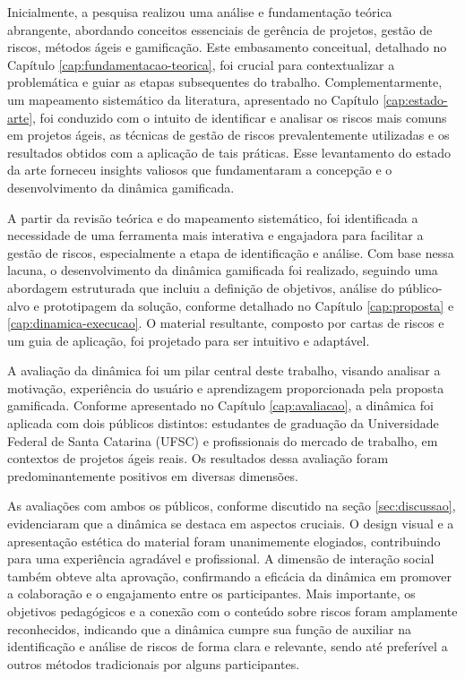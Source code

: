 \documentclass[
	12pt,
	openright,
	twoside,
	a4paper,
	english,
	brazil
	]{abntex2}
\begin{document}
Inicialmente, a pesquisa realizou uma análise e fundamentação teórica abrangente, abordando conceitos essenciais de gerência de projetos, gestão de riscos, métodos ágeis e gamificação. Este embasamento conceitual, detalhado no Capítulo \ref{cap:fundamentacao-teorica}, foi crucial para contextualizar a problemática e guiar as etapas subsequentes do trabalho. Complementarmente, um mapeamento sistemático da literatura, apresentado no Capítulo \ref{cap:estado-arte}, foi conduzido com o intuito de identificar e analisar os riscos mais comuns em projetos ágeis, as técnicas de gestão de riscos prevalentemente utilizadas e os resultados obtidos com a aplicação de tais práticas. Esse levantamento do estado da arte forneceu insights valiosos que fundamentaram a concepção e o desenvolvimento da dinâmica gamificada.

A partir da revisão teórica e do mapeamento sistemático, foi identificada a necessidade de uma ferramenta mais interativa e engajadora para facilitar a gestão de riscos, especialmente a etapa de identificação e análise. Com base nessa lacuna, o desenvolvimento da dinâmica gamificada foi realizado, seguindo uma abordagem estruturada que incluiu a definição de objetivos, análise do público-alvo e prototipagem da solução, conforme detalhado no Capítulo \ref{cap:proposta} e \ref{cap:dinamica-execucao}. O material resultante, composto por cartas de riscos e um guia de aplicação, foi projetado para ser intuitivo e adaptável.

A avaliação da dinâmica foi um pilar central deste trabalho, visando analisar a motivação, experiência do usuário e aprendizagem proporcionada pela proposta gamificada. Conforme apresentado no Capítulo \ref{cap:avaliacao}, a dinâmica foi aplicada com dois públicos distintos: estudantes de graduação da Universidade Federal de Santa Catarina (UFSC) e profissionais do mercado de trabalho, em contextos de projetos ágeis reais. Os resultados dessa avaliação foram predominantemente positivos em diversas dimensões.

As avaliações com ambos os públicos, conforme discutido na seção \ref{sec:discussao}, evidenciaram que a dinâmica se destaca em aspectos cruciais. O design visual e a apresentação estética do material foram unanimemente elogiados, contribuindo para uma experiência agradável e profissional. A dimensão de interação social também obteve alta aprovação, confirmando a eficácia da dinâmica em promover a colaboração e o engajamento entre os participantes. Mais importante, os objetivos pedagógicos e a conexão com o conteúdo sobre riscos foram amplamente reconhecidos, indicando que a dinâmica cumpre sua função de auxiliar na identificação e análise de riscos de forma clara e relevante, sendo até preferível a outros métodos tradicionais por alguns participantes.
\end{document}
